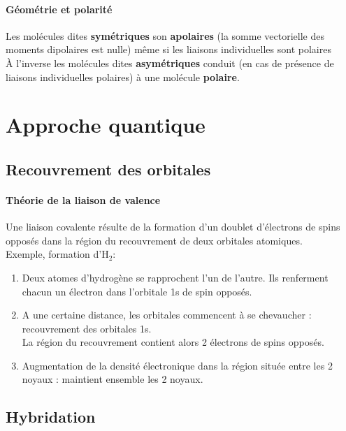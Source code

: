 \documentclass[10pt,a4paper]{book}
\begin{document}
\paragraph{Géométrie et polarité} Les molécules dites \textbf{symétriques} son \textbf{apolaires} (la somme vectorielle des moments dipolaires est nulle) même si les liaisons individuelles sont polaires \\
À l'inverse les molécules dites \textbf{asymétriques} conduit (en cas de présence de liaisons individuelles polaires) à une molécule \textbf{polaire}.

\section{Approche quantique}

\subsection{Recouvrement des orbitales}

\paragraph{Théorie de la liaison de valence} Une liaison covalente résulte de la formation d’un doublet d’électrons de spins opposés dans la région du recouvrement de deux orbitales atomiques. \\
Exemple, formation d'H$_2$:
\begin{enumerate}
\item Deux atomes d’hydrogène se rapprochent l’un de l’autre. Ils renferment chacun un électron dans l’orbitale 1s de spin opposés.
\item A une certaine distance, les orbitales commencent à se chevaucher : recouvrement des orbitales 1s. \\
La région du recouvrement contient alors 2 électrons de spins opposés.
\item Augmentation de la densité électronique dans la région située entre les 2 noyaux : maintient ensemble les 2 noyaux.
\end{enumerate}

\subsection{Hybridation}
\end{document}
